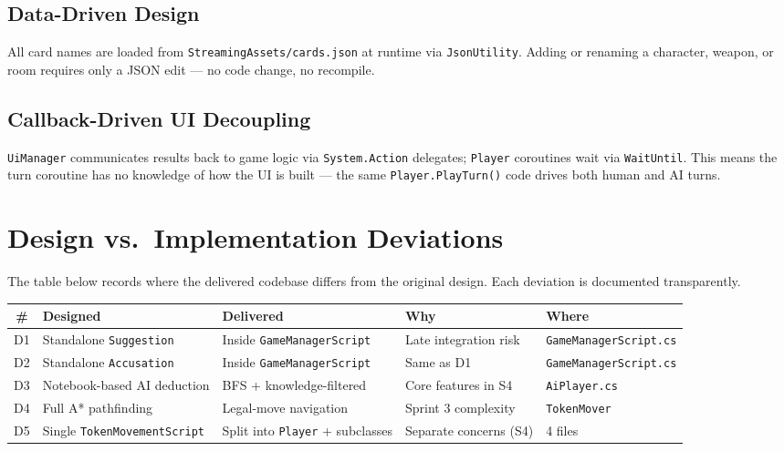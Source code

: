 \subsection*{Data-Driven Design}
All card names are loaded from \texttt{StreamingAssets/cards.json} at runtime via \texttt{JsonUtility}. Adding or renaming a character, weapon, or room requires only a JSON edit --- no code change, no recompile.

\subsection*{Callback-Driven UI Decoupling}
\texttt{UiManager} communicates results back to game logic via \texttt{System.Action} delegates; \texttt{Player} coroutines wait via \texttt{WaitUntil}. This means the turn coroutine has no knowledge of how the UI is built --- the same \texttt{Player.PlayTurn()} code drives both human and AI turns.

\section{Design vs.\ Implementation Deviations}

The table below records where the delivered codebase differs from the original design. Each deviation is documented transparently.

\begin{table}[H]
\centering
\footnotesize
\setlength{\tabcolsep}{4pt}
\begin{tabular}{|c|p{2.4cm}|p{2.8cm}|p{2.4cm}|p{2.8cm}|}
\hline
\textbf{\#} & \textbf{Designed} & \textbf{Delivered} & \textbf{Why} & \textbf{Where} \\ \hline
D1 & Standalone \texttt{Suggestion} & Inside \texttt{GameManager\-Script} & Late integration risk & \texttt{GameManager\-Script.cs} \\ \hline
D2 & Standalone \texttt{Accusation} & Inside \texttt{GameManager\-Script} & Same as D1 & \texttt{GameManager\-Script.cs} \\ \hline
D3 & Notebook-based AI deduction & BFS + knowledge-filtered & Core features in S4 & \texttt{AiPlayer.cs} \\ \hline
D4 & Full A* pathfinding & Legal-move navigation & Sprint 3 complexity & \texttt{TokenMover} \\ \hline
D5 & Single \texttt{TokenMovement\-Script} & Split into \texttt{Player} + subclasses & Separate concerns (S4) & 4 files \\ \hline
\end{tabular}
\end{table}

